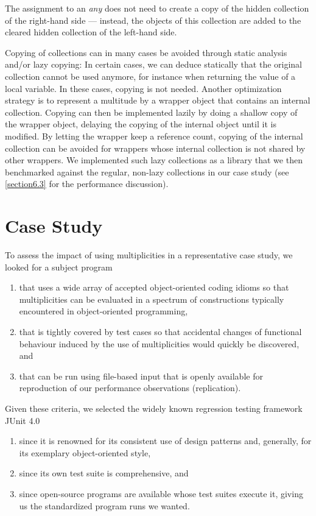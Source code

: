 {\noindent The assignment to an \emph{any} does not need to
create a copy of the hidden collection of the right-hand side --- instead, the
objects of this collection are added to the cleared hidden collection of
the left-hand side.

Copying of collections can in many cases be avoided through static analysis and/or lazy
copying: In certain cases, we can deduce statically that the original
collection cannot be used anymore, for instance when returning the value of
a local variable. In these cases, copying is not needed. Another
optimization strategy is to represent a multitude by a wrapper object that
contains an internal collection. Copying can then be implemented lazily by
doing a shallow copy of the wrapper object, delaying the copying of the
internal object until it is modified. By letting the wrapper keep a
reference count, copying of the internal collection can be avoided for
wrappers whose internal collection is not shared by other wrappers.
We implemented such lazy collections as a library that we then benchmarked
against the regular, non-lazy collections in our case study (see
\autoref{section6.3} for the performance discussion).

\section{Case Study}
\label{section6}

\noindent To assess the impact of using multiplicities in a representative
case study, we looked for a subject program

\begin{enumerate}
  \item that uses a wide array of accepted object-oriented coding idioms so
    that multiplicities can be evaluated in a spectrum of constructions
    typically encountered in object-oriented programming,
  \item that is tightly covered by test cases so that accidental changes of
    functional behaviour induced by the use of multiplicities would quickly be
    discovered, and
  \item that can be run using file-based input that is openly available for
    reproduction of our performance observations (replication).
\end{enumerate}

\noindent Given these criteria, we selected the widely known regression
testing framework JUnit 4.0

\begin{enumerate}
  \item since it is renowned for its consistent use of design patterns and,
    generally, for its exemplary object-oriented style,
  \item since its own test suite is comprehensive, and
  \item since open-source programs are available whose test suites execute it,
    giving us the standardized program runs we wanted.
\end{enumerate}

}
